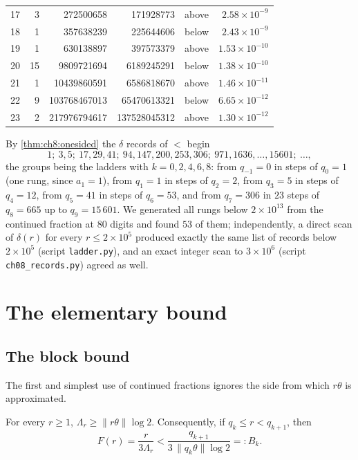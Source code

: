 \begin{table}[ht]
\begin{tabular}{@{}rrrrlr@{}}
17 & 3 & 272500658 & 171928773 & above & $2.58\times10^{-9}$ \\
18 & 1 & 357638239 & 225644606 & below & $2.43\times10^{-9}$ \\
19 & 1 & 630138897 & 397573379 & above & $1.53\times10^{-10}$ \\
20 & 15 & 9809721694 & 6189245291 & below & $1.38\times10^{-10}$ \\
21 & 1 & 10439860591 & 6586818670 & above & $1.46\times10^{-11}$ \\
22 & 9 & 103768467013 & 65470613321 & below & $6.65\times10^{-12}$ \\
23 & 2 & 217976794617 & 137528045312 & above & $1.30\times10^{-12}$ \\
\bottomrule
\end{tabular}
\end{table}

By \cref{thm:ch8:onesided} the $\delta$ records of $\lt$ begin
\[
  1;\ 3,5;\ 17,29,41;\ 94,147,200,253,306;\ 971,1636,\dots,15601;\ \dots,
\]
the groups being the ladders with $k=0,2,4,6,8$: from $q_{-1}=0$ in steps of
$q_0=1$ (one rung, since $a_1=1$), from $q_1=1$ in steps of $q_2=2$, from
$q_3=5$ in steps of $q_4=12$, from $q_5=41$ in steps of $q_6=53$, and from
$q_7=306$ in $23$ steps of $q_8=665$ up to $q_9=15\,601$. We generated all
rungs below $2\times10^{13}$ from the continued fraction at $80$ digits and
found $53$ of them; independently, a direct scan of $\delta(r)$ for every
$r\leq2\times10^{5}$ produced exactly the same list of records below
$2\times10^5$ (script \texttt{ladder.py}), and an exact integer scan to
$3\times10^{6}$ (script \texttt{ch08\_records.py}) agreed as well.

\section{The elementary bound}\label{sec:ch8:elementary}

\subsection{The block bound}

The first and simplest use of continued fractions ignores the side from which
$r\theta$ is approximated.

\begin{lemma}\label{lem:block}
For every $r\geq1$, $\Lambda_r\geq\|r\theta\|\log2$. Consequently, if
$q_k\leq r<q_{k+1}$, then
\begin{equation}\label{eq:ch8:block}
  F(r)=\frac{r}{3\Lambda_r}<\frac{q_{k+1}}{3\,\|q_k\theta\|\log2}=:B_k .
\end{equation}
\end{lemma}

